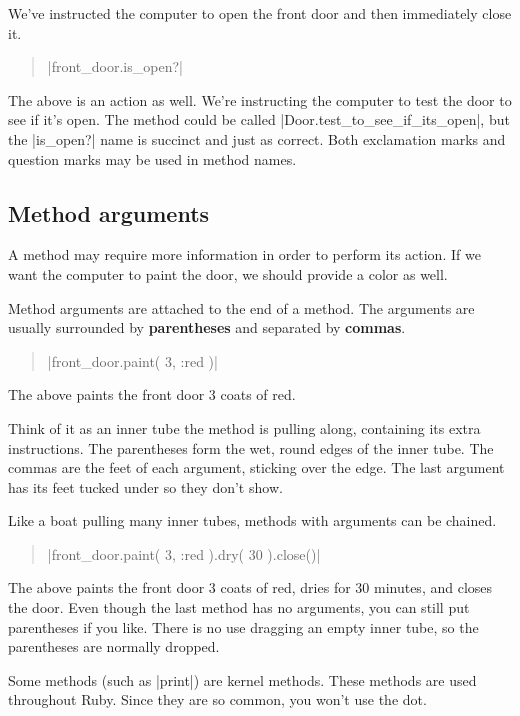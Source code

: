 \documentclass[12pt,twoside]{report}
\begin{document}
We've instructed the computer to open the front door and then
immediately close it.

\begin{quote}
\rubyinline|front_door.is_open?|\end{quote}


The above is an action as well.  We're instructing the computer to
test the door to see if it's open. The method could be called
\rubyinline|Door.test_to_see_if_its_open|, but the
\rubyinline|is_open?| name is succinct and just as
correct.  Both exclamation marks and question marks may be used in
method names.



\subsection{Method arguments}



A method may require more information in order to perform its action.
If we want the computer to paint the door, we should provide a color
as well.

Method arguments are attached to the end of a method.  The arguments
are usually surrounded by {\bf parentheses} and separated by {\bf
  commas}.

\begin{quote}
\rubyinline|front_door.paint( 3, :red )|\end{quote}


The above paints the front door 3 coats of red.

Think of it as an inner tube the method is pulling along, containing
its extra instructions. The parentheses form the wet, round edges of
the inner tube.  The commas are the feet of each argument, sticking
over the edge.  The last argument has its feet tucked under so they
don't show.

Like a boat pulling many inner tubes, methods with arguments can be
chained.

\begin{quote}
\rubyinline|front_door.paint( 3, :red ).dry( 30 ).close()|\end{quote}

The above paints the front door 3 coats of red, dries for 30 minutes,
and closes the door.  Even though the last method has no arguments,
you can still put parentheses if you like.  There is no use dragging
an empty inner tube, so the parentheses are normally dropped.

Some methods (such as \rubyinline|print|) are kernel
methods.  These methods are used throughout Ruby.  Since they are so
common, you won't use the dot.
\end{document}

